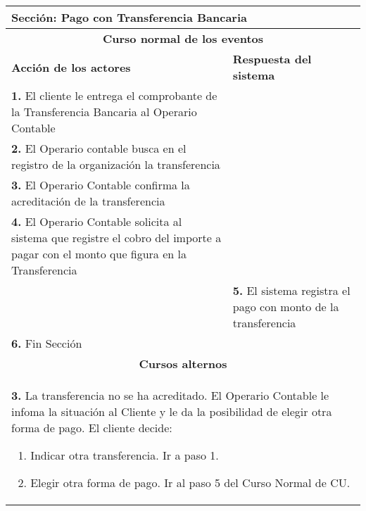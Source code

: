 \documentclass[12pt]{extarticle}
\begin{document}
    \begin{longtable}{ |p{8cm}|p{8cm}| }
        \hline
        \multicolumn{2}{|p{16cm}|}{\textbf{Sección}: Pago con Transferencia Bancaria}\\
        \hline
        \multicolumn{2}{|c|}{\textbf{Curso normal de los eventos}}\\
        \hline
        \textbf{Acción de los actores} & \textbf{Respuesta del sistema}\\
            \hline
            \textbf{1. }El cliente le entrega el comprobante de la Transferencia Bancaria al Operario Contable& \\
            \hline
            \textbf{2. }El Operario contable busca en el registro de la organización la transferencia &\\
            \hline
            \textbf{3. }El Operario Contable confirma la acreditación de la transferencia & \\
            \hline
            \textbf{4. }El Operario Contable solicita al sistema que registre el cobro del importe a pagar con el monto que figura en la Transferencia& \\
            \hline
            & \textbf{5. } El sistema registra el pago con monto de la transferencia\\
            \hline
            \textbf{6. }Fin Sección &\\
            \hline
        \multicolumn{2}{|c|}{\textbf{Cursos alternos}}\\
        \hline
        \multicolumn{2}{|p{16cm}|}{\textbf{3. } La transferencia no se ha acreditado. El Operario Contable le infoma la situación al Cliente y le da la posibilidad de elegir otra forma de pago. El cliente decide:
        \begin{enumerate}[label=(\alph*)]
            \item Indicar otra transferencia. Ir a paso 1.
            \item Elegir otra forma de pago. Ir al paso 5 del Curso Normal de CU. 
        \end{enumerate}}\\
        \hline
    \end{longtable}
\end{document}
